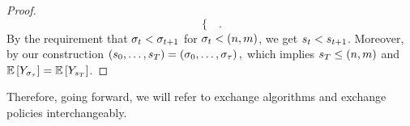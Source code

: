 \begin{proof}
\[\begin{cases}
        \end{cases} .
    \]
    By the requirement that
    \(
        \sigma_{t} < \sigma_{t+1}
    \)
    for 
    \(
        \sigma_{t} <
        \left(
            n,m
        \right)
    \), we get
    $s_{t} <s_{t+1}$.
    Moreover, by our construction
    \(
        \left(
            s_{0},
            \ldots,
            s_{T}
        \right)
        =
        \left(
            \sigma_{0},
            \ldots,
            \sigma_{\tau}
        \right),
    \)
    which implies
    \(
        s_{T}
        \leq
        \left(
            n,m
        \right)
    \)
    and 
    \(
        \mathbb{E}\left[
            Y_{
                \sigma_{\tau}
            }
        \right]
        =
        \mathbb{E}\left[
            Y_{
                s_{T}
            }
        \right]
    \).
\end{proof}  

Therefore, going forward, we will refer to exchange algorithms and exchange policies interchangeably.


